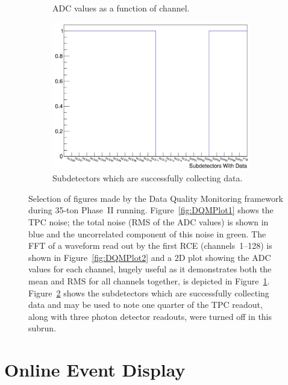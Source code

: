 \begin{figure}
\begin{subfigure}[t]{0.48\linewidth}
    \caption{ADC values as a function of channel.}
    \label{fig:DQMPlot3}
  \end{subfigure}
  \begin{subfigure}[t]{0.48\linewidth}
    \centering
    \includegraphics[width=0.95\textwidth]{DQM4.png}
    \caption{Subdetectors which are successfully collecting data.}
    \label{fig:DQMPlot4}
  \end{subfigure}
  \caption[Selection of figures made by the Data Quality Monitoring framework during 35-ton Phase~II running.]{Selection of figures made by the Data Quality Monitoring framework during 35-ton Phase~II running.  Figure~\ref{fig:DQMPlot1} shows the TPC noise; the total noise (RMS of the ADC values) is shown in blue and the uncorrelated component of this noise in green.  The FFT of a waveform read out by the first RCE (channels~1--128) is shown in Figure~\ref{fig:DQMPlot2} and a 2D plot showing the ADC values for each channel, hugely useful as it demonstrates both the mean and RMS for all channels together, is depicted in Figure~\ref{fig:DQMPlot3}.  Figure~\ref{fig:DQMPlot4} shows the subdetectors which are successfully collecting data and may be used to note one quarter of the TPC readout, along with three photon detector readouts, were turned off in this subrun.}
  \label{fig:DQMPlots}
\end{figure}

\section{Online Event Display}\label{sec:EventDisplay}

